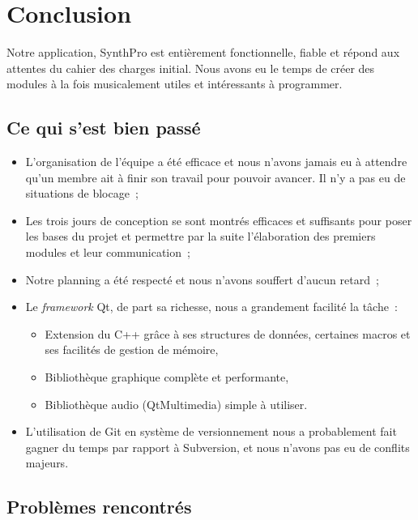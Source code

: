 \section{Conclusion}

Notre application, SynthPro est entièrement fonctionnelle, fiable
et répond aux attentes du cahier des charges initial. Nous avons eu
le temps de créer des modules à la fois musicalement utiles et
intéressants à programmer.

\subsection{Ce qui s'est bien passé}

\begin{itemize}
\item
  L'organisation de l'équipe a été efficace et nous n'avons jamais eu
  à attendre qu'un membre ait à finir son travail pour pouvoir
  avancer. Il n'y a pas eu de situations de blocage~;
\item
  Les trois jours de conception se sont montrés efficaces et
  suffisants pour poser les bases du projet et permettre par la suite
  l'élaboration des premiers modules et leur communication~;
\item
  Notre planning a été respecté et nous n'avons souffert d'aucun
  retard~;
\item
  Le \emph{framework} Qt, de part sa richesse, nous a grandement
  facilité la tâche~:
  \begin{itemize}
  \item
    Extension du C++ grâce à ses structures de données, certaines
    macros et ses facilités de gestion de mémoire,
  \item
    Bibliothèque graphique complète et performante,
  \item
    Bibliothèque audio (QtMultimedia) simple à utiliser.
  \end{itemize}
\item
  L'utilisation de Git en système de versionnement nous a
  probablement fait gagner du temps par rapport à Subversion, et nous
  n'avons pas eu de conflits majeurs.
\end{itemize}

\subsection{Problèmes rencontrés}

